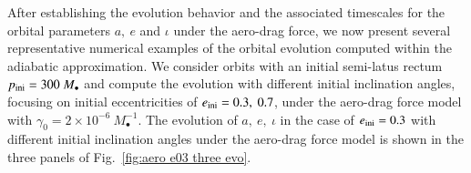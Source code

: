 \documentclass[aps,prx,reprint,superscriptaddress,nofootinbib,longbibliography]{revtex4-1}
\begin{document}
After establishing the evolution behavior and the associated timescales for the orbital parameters $a,\ e$ and $\iota$ under the aero-drag force, we now present several representative numerical examples of the orbital evolution computed within the adiabatic approximation.
We consider orbits with an initial semi-latus rectum $p_{\rm ini}=300\ M_{\bullet}$ and compute the evolution with different initial inclination angles, focusing on initial eccentricities of $e_{\rm ini}=0.3,\ 0.7$, under the aero-drag force model with $\gamma_{0}=2\times 10^{-6}\ M_{\bullet}^{-1}$.
The evolution of $a,\ e,\ \iota$ in the case of $e_{\rm ini}=0.3$ with different initial inclination angles under the aero-drag force model is shown in the three panels of Fig.~\ref{fig:aero e03 three evo}. 
\end{document}

